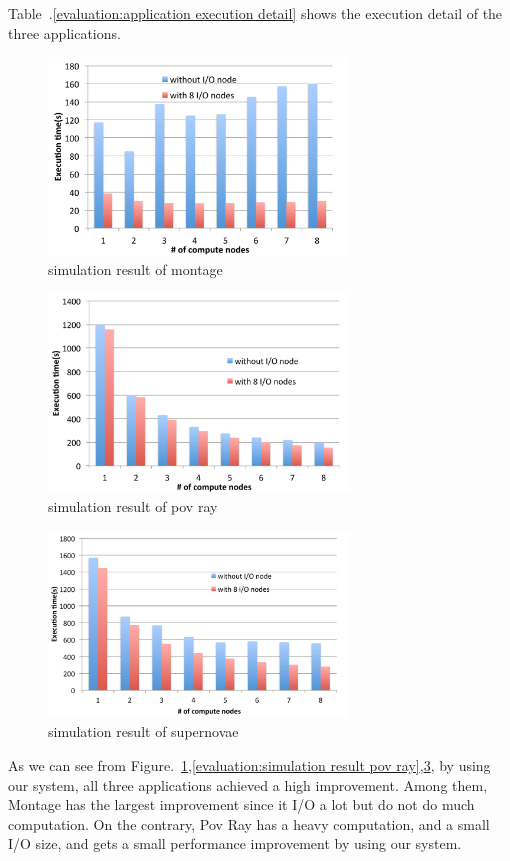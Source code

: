 Table~.\ref{evaluation:application execution detail} shows the execution detail of the three
applications.


\begin{figure}
\centering
\includegraphics[width=8cm]{img/simulation_montage}
\caption{simulation result of montage}
\label{evaluation:simulation result montage}
\end{figure}


\begin{figure}
\centering
\includegraphics[width=8cm]{img/simulation_povray}
\caption{simulation result of pov ray}
\label{evaluation:simulation result pov ray}
\end{figure}

\begin{figure}
\centering
\includegraphics[width=8cm]{img/simulation_supernovae}
\caption{simulation result of supernovae}
\label{evaluation:simulation result supernovae}
\end{figure}

As we can see from Figure.~\ref{evaluation:simulation result montage},\ref{evaluation:simulation
result pov ray},\ref{evaluation:simulation result supernovae}, by using our system, all three
applications achieved a high improvement.
Among them, Montage has the largest improvement since it I/O a lot but do not do much
computation.
On the contrary, Pov Ray has a heavy computation, and a small I/O size, and gets a small performance
improvement by using our system.
